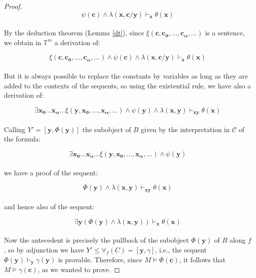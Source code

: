 \documentclass[a4paper,11pt]{article}
\theoremstyle{plain}
\theoremstyle{plain}
\theoremstyle{remark}
\newcommand{\theory}{\ensuremath{\mathbb{T}}}
\begin{document}
\begin{proof}
$$\psi(\mathbf{c}) \wedge \lambda(\mathbf{x}, \mathbf{c}/\mathbf{y}) \vdash_{\mathbf{x}} \theta(\mathbf{x})$$
\\
By the deduction theorem (Lemma \ref{dt}), since $\xi(\mathbf{c}, \mathbf{c_0}, ..., \mathbf{c_{\alpha}}, ...)$ is a sentence, we obtain in $\theory^m$ a derivation of:

$$\xi(\mathbf{c}, \mathbf{c_0}, ..., \mathbf{c_{\alpha}}, ...) \wedge \psi(\mathbf{c}) \wedge \lambda(\mathbf{x}, \mathbf{c}/\mathbf{y}) \vdash_{\mathbf{x}} \theta(\mathbf{x})$$
\\
But it is always possible to replace the constants by variables as long as they are added to the contexts of the sequents, so using the existential rule, we have also a derivation of:

$$\exists \mathbf{x_0} ... \mathbf{x_{\alpha}} ... \xi(\mathbf{y}, \mathbf{x_0}, ..., \mathbf{x_{\alpha}}, ...) \wedge \psi(\mathbf{y}) \wedge \lambda(\mathbf{x}, \mathbf{y}) \vdash_{\mathbf{x} \mathbf{y}} \theta(\mathbf{x})$$
\\
Calling $Y'=[\mathbf{y}, \Phi(\mathbf{y})]$ the subobject of $B$ given by the interpretation in $\mathcal{C}$ of the formula:

$$\exists \mathbf{x_0} ... \mathbf{x_{\alpha}} ... \xi(\mathbf{y}, \mathbf{x_0}, ..., \mathbf{x_{\alpha}}, ...) \wedge \psi(\mathbf{y})$$
\\
we have a proof of the sequent:

$$\Phi(\mathbf{y}) \wedge \lambda(\mathbf{x}, \mathbf{y}) \vdash_{\mathbf{x} \mathbf{y}} \theta(\mathbf{x})$$
\\
and hence also of the sequent:

$$\exists \mathbf{y} (\Phi(\mathbf{y}) \wedge \lambda(\mathbf{x}, \mathbf{y})) \vdash_{\mathbf{x}} \theta(\mathbf{x})$$
\\
Now the antecedent is precisely the pullback of the subobject $\Phi(\mathbf{y})$ of $B$ along $f$, so by adjunction we have $Y' \leq \forall_f(C)=[\mathbf{y}, \gamma]$, i.e., the sequent $\Phi(\mathbf{y}) \vdash_{\mathbf{y}} \gamma(\mathbf{y})$ is provable. Therefore, since $M \vDash \Phi(\mathbf{c})$, it follows that $M \vDash \gamma(\mathbf{c})$, as we wanted to prove.

\end{proof}

\end{document}
